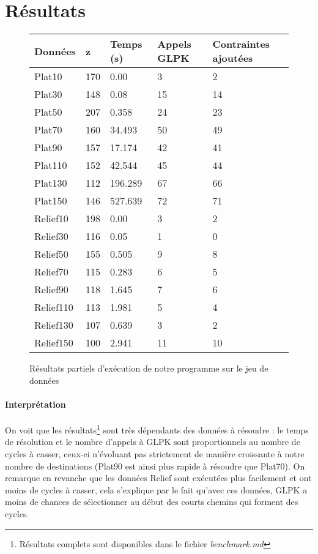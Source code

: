 \documentclass[a4paper,12pt]{article}
\begin{document}
\section{Résultats}


\begin{figure}[!ht]
    \centering
    \begin{tabular}{ | p{3cm} | p{1cm} | p{2cm} | p{2cm} | p{3cm} | }
    	\hline \textbf{Données} & \textbf{z} & \textbf{Temps (s)} & \textbf{Appels GLPK} & \textbf{Contraintes ajoutées} \\ 
    	\hline Plat10 & 170 & 0.00 & 3 & 2 \\
    	\hline Plat30 & 148 & 0.08 & 15 & 14\\
    	\hline Plat50 & 207 & 0.358 & 24 & 23\\
    	\hline Plat70 & 160 & 34.493 & 50 & 49\\
    	\hline Plat90 & 157 & 17.174 & 42 & 41\\
    	\hline Plat110 & 152 & 42.544 & 45 & 44\\
    	\hline Plat130 & 112 & 196.289 & 67 & 66\\
    	\hline Plat150 & 146 & 527.639 & 72 & 71\\
    	\hline
    	\hline Relief10 & 198 & 0.00 & 3 & 2\\
    	\hline Relief30 & 116 & 0.05 & 1 & 0\\
    	\hline Relief50 & 155 & 0.505 & 9 & 8\\
    	\hline Relief70 & 115 & 0.283 & 6 & 5\\
    	\hline Relief90 & 118 & 1.645 & 7 & 6\\
    	\hline Relief110 & 113 & 1.981 & 5 & 4\\
    	\hline Relief130 & 107 & 0.639 & 3 & 2\\
    	\hline Relief150 & 100 & 2.941 & 11 & 10\\
    	\hline
    \end{tabular} 
\caption{Résultats partiels d'exécution de notre programme sur le jeu de données}
\label{planning}
\end{figure}

\paragraph{Interprétation}{
    On voit que les résultats\footnote{Résultats complets sont disponibles dans le fichier \textit{benchmark.md}} sont très dépendants des données à résoudre : le temps de résolution et le nombre d'appels à GLPK sont proportionnels au nombre de cycles à casser, ceux-ci n'évoluant pas strictement de manière croissante à notre nombre de destinations (Plat90 est ainsi plus rapide à résoudre que Plat70).\newline
    On remarque en revanche que les données Relief sont exécutées plus facilement et ont moins de cycles à casser, cela s'explique par le fait qu'avec ces données, GLPK a moins de chances de sélectionner au début des courts chemins qui forment des cycles.
}
\end{document}
